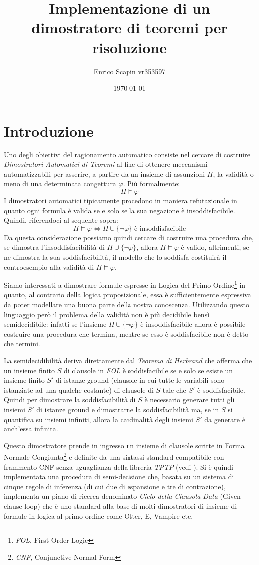 \documentclass[a4paper,11pt]{article}
\title{\bf{Implementazione di un dimostratore di teoremi per risoluzione}}
\author{Enrico Scapin vr353597}
\date{\today}
\begin{document}
\maketitle

\section{Introduzione}
Uno degli obiettivi del ragionamento automatico consiste nel cercare di costruire \emph{Dimostratori Automatici di Teoremi} al fine di ottenere meccanismi automatizzabili per asserire, a partire da un insieme di assunzioni $H$, la validità o meno di una determinata congettura $\varphi$. Più formalmente:
\[ H \models \varphi \]
I dimostratori automatici tipicamente procedono in maniera refutazionale in quanto ogni formula è valida se e solo se la sua negazione è insoddisfacibile. Quindi, riferendoci al sequente sopra:
\[ H \models \varphi \Longleftrightarrow H \cup \lbrace\neg \varphi\rbrace \text{ è insoddisfacibile} \]
Da questa considerazione possiamo quindi cercare di costruire una procedura che, se dimostra l'insoddisfacibilità di $H \cup \lbrace\neg \varphi\rbrace$, allora $ H \models \varphi $ è valido, altrimenti, se ne dimostra la sua soddisfacibilità, il modello che lo soddisfa costituirà il controesempio alla validità di $ H \models \varphi $.\par
Siamo interessati a dimostrare formule espresse in Logica del Primo Ordine\footnote{\emph{FOL}, First Order Logic} in quanto, al contrario della logica proposizionale, essa è sufficientemente espressiva da poter modellare una buona parte della nostra conoscenza. Utilizzando questo linguaggio però il problema della validità non è più decidibile bensì semidecidibile: infatti se l'insieme $H \cup \lbrace\neg \varphi\rbrace $ è insoddisfacibile allora è possibile costruire una procedura che termina, mentre se esso è soddisfacibile non è detto che termini. \par
La semidecidibilità deriva direttamente dal \emph{Teorema di Herbrand} che afferma che un insieme finito $S$ di clausole in \emph{FOL} è soddisfacibile se e solo se esiste un insieme finito $S'$ di istanze ground (clausole in cui tutte le variabili sono istanziate ad una qualche costante) di clausole di $S$ tale che $S'$ è soddisfacibile. Quindi per dimostrare la soddisfacibilità di $S$ è necessario generare tutti gli insiemi $S'$ di istanze ground e dimostrarne la soddisfacibilità ma, se in $S$ si quantifica su insiemi infiniti, allora la cardinalità degli insiemi $S'$ da generare è anch'essa infinita.\par
Questo dimostratore prende in ingresso un insieme di clausole scritte in Forma Normale Congiunta\footnote{\emph{CNF}, Conjunctive Normal Form} e definite da una sintassi standard compatibile con frammento CNF senza uguaglianza della libreria \emph{TPTP} (vedi \cite{TPTP}). Si è quindi implementata una procedura di semi-decisione che, basata su un sistema di cinque regole di inferenza (di cui due di espansione e tre di contrazione), implementa un piano di ricerca denominato \emph{Ciclo della Clausola Data} (Given clause loop) che è uno standard alla base di molti dimostratori di insieme di formule in logica al primo ordine come Otter, E, Vampire etc.
\end{document}
